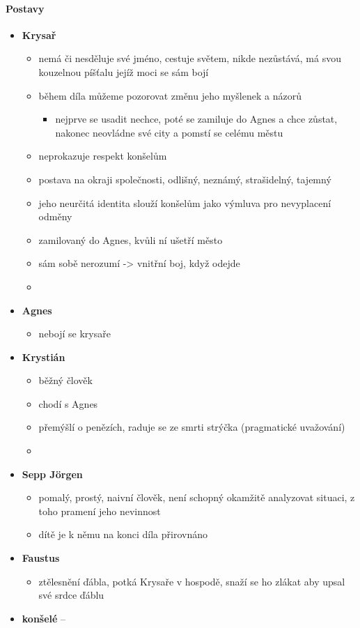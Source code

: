 \documentclass[10pt,a4paper]{article}
\begin{document}
\paragraph{Postavy}
\begin{itemize}
\item \textbf{Krysař}
	\begin{itemize}
	\item nemá či nesděluje své jméno, cestuje světem, nikde nezůstává, má svou kouzelnou píšťalu jejíž moci se sám bojí
	\item během díla můžeme pozorovat změnu jeho myšlenek a názorů
		\begin{itemize}
		\item nejprve se usadit nechce, poté se zamiluje do Agnes a chce zůstat, nakonec neovládne své city a pomstí se celému městu
		\end{itemize}
	\item neprokazuje respekt konšelům
	\item postava na okraji společnosti, odlišný, neznámý, strašidelný, tajemný
	\item jeho neurčitá identita slouží konšelům jako výmluva pro nevyplacení odměny
	\item zamilovaný do Agnes, kvůli ní ušetří město
	\item sám sobě nerozumí -> vnitřní boj, když odejde
	\item 
	\end{itemize}
\item \textbf{Agnes}
	\begin{itemize}
	\item nebojí se krysaře
	\end{itemize}
\item \textbf{Krystián}
	\begin{itemize}
	\item běžný člověk
	\item chodí s Agnes
	\item přemýšlí o penězích, raduje se ze smrti strýčka (pragmatické uvažování)
	\item 
	\end{itemize}
\item \textbf{Sepp Jörgen}
	\begin{itemize}
	\item pomalý, prostý, naivní člověk, není schopný okamžitě analyzovat situaci, z toho pramení jeho nevinnost
	\item dítě je k němu na konci díla přirovnáno
	\end{itemize}
\item \textbf{Faustus}
	\begin{itemize}
	\item ztělesnění ďábla, potká Krysaře v hospodě, snaží se ho zlákat aby upsal své srdce ďáblu
	\end{itemize}
\item \textbf{konšelé} --
\end{itemize}
\end{document}
